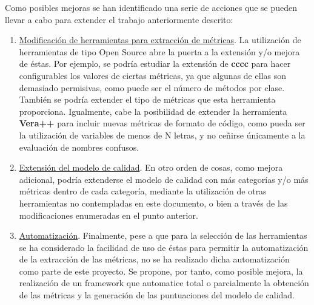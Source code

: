 \documentclass[11pt]{article}
\begin{document}
Como posibles mejoras se han identificado una serie de acciones que se pueden llevar a cabo para extender el trabajo anteriormente descrito:
\begin{enumerate}
\item{\underline{Modificación de herramientas para extracción de métricas}}. La utilización de herramientas de tipo Open Source abre la puerta a la extensión y/o mejora de éstas. Por ejemplo, se podría estudiar la extensión de \textbf{cccc} para hacer configurables los valores de ciertas métricas, ya que algunas de ellas son demasiado permisivas, como puede ser el número de métodos por clase. También se podría extender el tipo de métricas que esta herramienta proporciona.
Igualmente, cabe la posibilidad de extender la herramienta \textbf{Vera++} para incluir nuevas métricas de formato de código, como pueda ser la utilización de variables de menos de N letras, y no ceñirse únicamente a la evaluación de nombres confusos.
\item{\underline{Extensión del modelo de calidad}}. En otro orden de cosas, como mejora adicional, podría extenderse el modelo de calidad con más categorías y/o más métricas dentro de cada categoría, mediante la utilización de otras herramientas no contempladas en este documento, o bien a través de las modificaciones enumeradas en el punto anterior.
\item{\underline{Automatización}}. Finalmente, pese a que para la selección de las herramientas se ha considerado la facilidad de uso de éstas para permitir la automatización de la extracción de las métricas, no se ha realizado dicha automatización como parte de este proyecto. Se propone, por tanto, como posible mejora, la realización de un framework que automatice total o parcialmente la obtención de las métricas y la generación de las puntuaciones del modelo de calidad.
\end{enumerate}

\pagebreak



\label{Bibliography}
\end{document}
